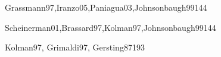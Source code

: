 \begin{syllabus}
   \begin{unit}{\DSBasicLogic}{}{Grassmann97,Iranzo05,Paniagua03,Johnsonbaugh99}{14}{4}
       \DSBasicLogicAllTopics
       \DSBasicLogicAllLearningOutcomes
   \end{unit}
   
   \begin{unit}{\DSProofTechniques}{}{Scheinerman01,Brassard97,Kolman97,Johnsonbaugh99}{14}{4}
      \DSProofTechniquesAllTopics
      \DSProofTechniquesAllLearningOutcomes
   \end{unit}
   
   \begin{unit}{\ARDigitallogicanddigitalsystems}{}{Kolman97, Grimaldi97, Gersting87}{19}{3}
      \ARDigitallogicanddigitalsystemsAllTopics
      \ARDigitallogicanddigitalsystemsAllLearningOutcomes
   \end{unit}
   
   \begin{coursebibliography}
   \end{coursebibliography}
   
   \end{syllabus}
   
   